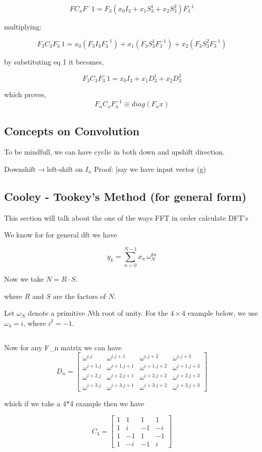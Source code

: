 \documentclass{article}
\begin{document}
\[FC_xF^-1 = F_3(x_0 I_3+x_1S_3^1 + x_2S_3^2)F_3^{-1}\]

multiplying:

\[F_3C_3F_3^-1 = x_0(F_3I_3F_3^{-1})+x_1(F_3S_3^1F_3^{-1}) + x_2(F_3S_3^2F_3^{-1})\]

by substituting eq 1 it becomes,

\[F_3C_3F_3^-1 =  x_0I_3 + x_1D_3^{1} + x_2D_3^{2} \]

which proves,
\[F_n C_xF_n^{-1} \equiv diag(F_nx) \]


\subsection{Concepts on Convolution}
To be mindfull, we can have cyclic in both down and upshift direction.

$\text{Downshift} \longrightarrow \text{left-shift on } I_n$
Proof:
[ say we have input vector (g) 


\subsection{Cooley - Tookey's Method (for general form)}
This section will talk about the one of the ways FFT in order calculate DFT's

We know for for general dft we have

\[
y_k = \sum_{n=0}^{N-1} x_n \, \omega_N^{k n}
\]

Now we take $N = R \cdot S$.

where $R$ and $S$ are the factors of $N$.

Let $\omega_N$ denote a primitive $N$th root of unity.
For the $4 \times 4$ example below, we use $\omega_4 = i$, where $i^2 = -1$.

\[\]

Now  for any F_n matrix we can have 
\[D_n = \begin{bmatrix}
    \omega^{i.j}  & \omega^{i.j+1}    & \omega^{i.j+2}   & \omega^{i.j+3}  \\ \omega^{i+1.j}   & \omega^{i+1.j+1}  & \omega^{i+1.j+2} & \omega^{i+1.j+3}   \\  \omega^{i+2.j}  & \omega^{i+2.j+1}  & \omega^{i+2.j+2} & \omega^{i+2.j+3}  \\ \omega^{i+3.j}  & \omega^{i+3.j+1}  & \omega^{i+3.j+2}  & \omega^{i+3.j+3} 
\end{bmatrix}\]

which if we take a 4*4 example then we have 

\[C_4  = \begin{bmatrix}
    1 &  1 & 1 & 1 \\ 1 & i & -1 & -i \\ 1 & -1 & 1 & -1 \\ 1 & -i & -1 & i 
\end{bmatrix}\]
\end{document}
